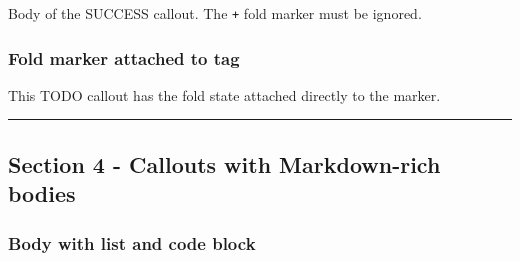 \begin{tcolorbox}[breakable,colback=ocGreBack,colframe=ocGreFrame,coltitle=ocGreTitle,left=3mm,boxed title style={left=1mm},title={\hspace*{-2.5mm}\iconCheck\; Title with plus marker}]

Body of the SUCCESS callout. The \texttt{+} fold marker must be ignored.

\end{tcolorbox}

\subsubsection{Fold marker attached to
tag}\label{inner-1-fold-marker-attached-to-tag}

\begin{tcolorbox}[breakable,colback=yellow!5!white,colframe=yellow!50!black,left=3mm,boxed title style={left=1mm},title={\hspace*{-2.5mm}\iconTodo\; TODO}]

This TODO callout has the fold state attached directly to the marker.

\end{tcolorbox}

\begin{center}\rule{0.5\linewidth}{0.5pt}\end{center}

\subsection{Section 4 - Callouts with Markdown-rich
bodies}\label{inner-1-section-4---callouts-with-markdown-rich-bodies}

\subsubsection{Body with list and code
block}\label{inner-1-body-with-list-and-code-block}

